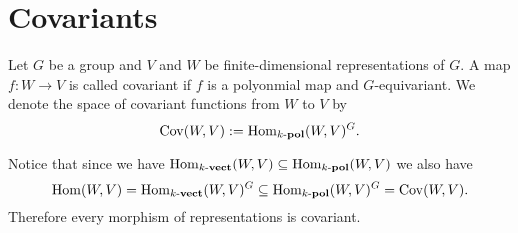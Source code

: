 \section{Covariants}


\begin{defi}
 Let $G$ be a group and $V$ and $W$ be finite-dimensional representations of $G$. A map $f : W \to V$ is called covariant if $f$ is a polyonmial map and $G$-equivariant. We denote the space of covariant functions from $W$ to $V$ by
 \[
  \operatorname{Cov}(W,V) :=  \operatorname{Hom}_{k\text{-}\mathbf{pol}}(W,V)^G.
 \]
\end{defi}

Notice that since we have $\operatorname{Hom}_{k\text{-}\mathbf{vect}}(W,V) \subseteq \operatorname{Hom}_{k\text{-}\mathbf{pol}}(W,V)$ we also have
\[
 \operatorname{Hom}(W,V) = \operatorname{Hom}_{k\text{-}\mathbf{vect}}(W,V)^G \subseteq \operatorname{Hom}_{k\text{-}\mathbf{pol}}(W,V)^G = \operatorname{Cov}(W,V).
\]
Therefore every morphism of representations is covariant.

























